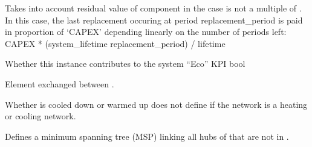 \documentclass[letterpaper,10pt,english]{sphinxmanual}
\begin{document}
\begin{fulllineitems}
\begin{fulllineitems}
\sphinxAtStartPar
Takes into account residual value of component in the case  is not a multiple of .
In this case, the last replacement occuring at period replacement\_period is paid in proportion of ‘CAPEX’
depending linearly on the number of periods left:
CAPEX * (system\_lifetime \sphinxhyphen{} replacement\_period) / lifetime

\end{fulllineitems}


\begin{fulllineitems}
\label{\detokenize{generated/tamos.network.ThermalNetwork:tamos.network.ThermalNetwork.eco_count}}
\pysigstartsignatures
{}
\pysigstopsignatures
\sphinxAtStartPar
Whether this instance contributes to the system “Eco” KPI
bool

\end{fulllineitems}


\begin{fulllineitems}
\label{\detokenize{generated/tamos.network.ThermalNetwork:tamos.network.ThermalNetwork.element}}
\pysigstartsignatures
{}
\pysigstopsignatures
\sphinxAtStartPar
Element exchanged between .

\sphinxAtStartPar
Whether  is cooled down or warmed up does not define if the network is a heating or cooling network.

\end{fulllineitems}


\begin{fulllineitems}
\label{\detokenize{generated/tamos.network.ThermalNetwork:tamos.network.ThermalNetwork.generate_MSP}}
\pysigstartsignatures
{}
\pysigstopsignatures
\sphinxAtStartPar
Defines a minimum spanning tree (MSP) linking all hubs of  that are not in .


\end{fulllineitems}
\end{fulllineitems}
\end{document}
